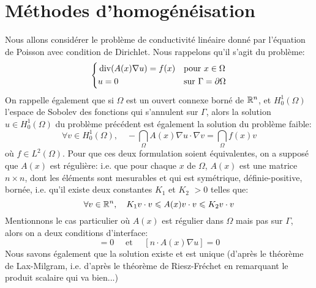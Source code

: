 \section{Méthodes d'homogénéisation}
Nous allons considérer le problème de conductivité linéaire donné par
l'équation de Poisson
avec condition de Dirichlet.
Nous rappelons qu'il s'agit du problème:
\begin{equation}
\left\{
\begin{aligned}
&\operatorname{div}(A(x)\nabla u) = f(x)&&\text{pour } x\in\Omega\\
&u=0 &&\text{sur } \Gamma=\partial\Omega
\end{aligned}
\right.
\end{equation}
On rappelle également que si $\Omega$ est un ouvert connexe borné de $\mathbb R^n$, et
$H_0^1(\Omega)$ l'espace de Sobolev des fonctions qui s'annulent sur $\Gamma$, alors la solution
$u\in H_0^1(\Omega)$ du problème précédent est également la solution du problème
faible:
\begin{equation}
\forall v\in H_0^1(\Omega),\quad -\dint_\Omega A(x)\nabla u\cdot\nabla v = \dint_\Omega f(x)v
\end{equation}
où $f\in L^2(\Omega)$.
Pour que ces deux formulation soient équivalentes, on a supposé que $A(x)$ est
régulière: i.e. que pour chaque $x$ de $\Omega$, $A(x)$ est une matrice $n\times n$,
dont les éléments sont mesurables et qui est symétrique, définie-positive, bornée, i.e. qu'il existe
deux constantes $K_1$ et $K_2$ $>0$ telles que:
\begin{equation}\forall v\in\mathbb R^n,\quad K_1 v\cdot v \leqslant A(x) v\cdot v \leqslant K_2 v\cdot v\end{equation}
Mentionnons le cas particulier où $A(x)$ est régulier dans $\Omega$ mais
pas sur $\Gamma$, alors on a deux conditions d'interface:
\begin{equation}
[u]=0 \quad\text{ et }\quad [n\cdot A(x)\nabla u]=0
\end{equation}
Nous savons également que la solution existe et est unique (d'après le théorème de Lax-Milgram,
 i.e. d'après le théorème de Riesz-Fréchet
en remarquant le produit scalaire qui va bien...)

